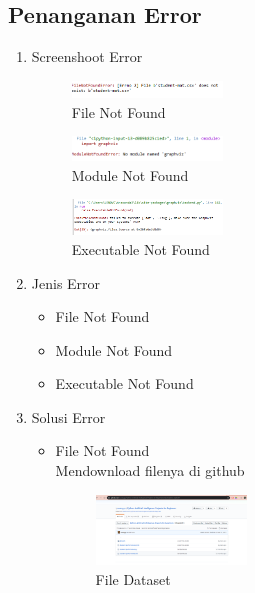 \subsection{Penanganan Error}
\begin{enumerate}
\item Screenshoot Error

\begin{figure}[H]
		\includegraphics[width=4cm]{figures/1174086/2/error/error1.PNG}
		\centering
		\caption{File Not Found}
	\end{figure}
	
	\begin{figure}[H]
		\includegraphics[width=4cm]{figures/1174086/2/error/error2.PNG}
		\centering
		\caption{Module Not Found}
	\end{figure}
	
	\begin{figure}[H]
		\includegraphics[width=4cm]{figures/1174086/2/error/error3.PNG}
		\centering
		\caption{Executable Not Found}
	\end{figure}
	
\item Jenis Error
	\begin{itemize}
	\item File Not Found
	\item Module Not Found
	\item Executable Not Found
	\end{itemize}
	
\item Solusi Error
\begin{itemize}
	\item File Not Found\\
	Mendownload filenya di github
	\begin{figure}[H]
		\includegraphics[width=4cm]{figures/1174086/2/error/solusi1.PNG}
		\centering
		\caption{File Dataset}
	\end{figure}
	

\end{itemize}
\end{enumerate}
